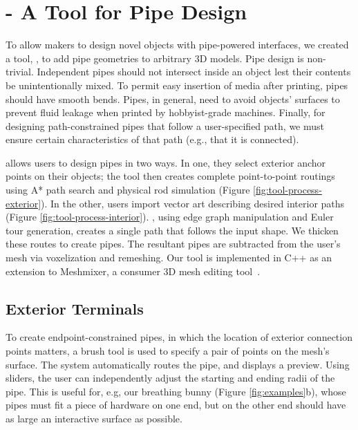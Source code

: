 \section{\systemname - A Tool for Pipe Design}
To allow makers to design novel objects with pipe-powered interfaces, we created a tool, \systemnamenospace, to add pipe geometries to arbitrary 3D models. Pipe design is non-trivial.  Independent pipes should not intersect inside an object lest their contents be unintentionally mixed.  To permit easy insertion of media after printing, pipes should have smooth bends.  Pipes, in general, need to avoid objects' surfaces to prevent fluid leakage when printed by hobbyist-grade machines.  Finally, for designing path-constrained pipes that follow a user-specified path, we must ensure certain characteristics of that path (e.g., that it is connected). 

\systemname allows users to design pipes in two ways. In one, they select exterior anchor points on their objects; the tool then creates complete point-to-point routings using A* path search and physical rod simulation (Figure \ref{fig:tool-process-exterior}). In the other, users import vector art describing desired interior paths (Figure \ref{fig:tool-process-interior}).  \systemname, using edge graph manipulation and Euler tour generation, creates a single path that follows the input shape.  We thicken these routes to create pipes.  The resultant pipes are subtracted from the user's mesh via voxelization and remeshing. Our tool is implemented in C++ as an extension to Meshmixer, a consumer 3D mesh editing tool~\cite{Schmidt-meshmixer}.

\subsection{Exterior Terminals}

To create endpoint-constrained pipes, in which the location of exterior connection points matters, a brush tool is used to specify a pair of points on the mesh's surface. The system automatically routes the pipe, and displays a preview.  Using sliders, the user can independently adjust the starting and ending radii of the pipe.  This is useful for, e.g, our breathing bunny (Figure \ref{fig:examples}b), whose pipes must fit a piece of hardware on one end, but on the other end should have as large an interactive surface as possible.

